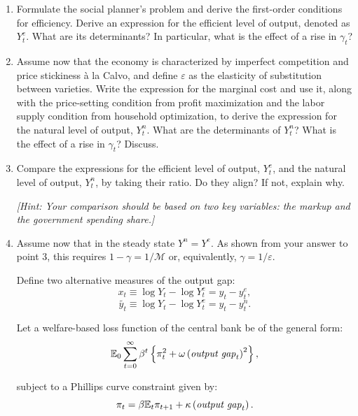 \documentclass[a4paper,11pt]{article}
\begin{document}
\begin{enumerate}
\item[1.]  Formulate the social planner’s problem and derive the first-order conditions for efficiency. Derive an expression for the efficient level of output, denoted as $Y_{t}^{e}$. What are its determinants? In particular, what is the effect of a rise in $\gamma_{t}$? 

\item [2.] Assume now that the economy is characterized by imperfect competition and price stickiness à la Calvo, and define $\varepsilon$ as the elasticity of substitution between varieties. Write the expression for the marginal cost and use it, along with the price-setting condition from profit maximization and the labor supply condition from household optimization, to derive the expression for the natural level of output, $Y^n_t$. What are the determinants of $Y^n_t$? What is the effect of a rise in $\gamma_{t}$? Discuss.

\item [3.] Compare the expressions for the efficient level of output, $Y^e_t$, and the natural level of output, $Y^n_t$, by taking their ratio. Do they align? If not, explain why. 

\textit{[Hint: Your comparison should be based on two key variables: the markup and the government spending share.]}

\item[4.] Assume now that in the steady state $Y^n=Y^e$. As shown from your answer to point 3, this requires $1-\gamma=1/\mathcal{M}$ or, equivalently, $\gamma=1/\varepsilon$. 

Define two alternative measures of the output gap:
\begin{equation}
x_{t}\equiv \log Y_t-\log Y^e_t=y_{t}-y_{t}^{e}  \label{xe},
\end{equation}
\begin{equation}
\tilde{y_{t}}\equiv \log Y_t-\log Y^e_t=y_{t}-y_{t}^{n}\label{yn}.
\end{equation}

Let a welfare-based loss function of the central bank be of the general form:
\begin{equation}
\mathbb{E}_{0} \sum_{t=0}^{\infty }\beta ^{t}\left \{ \pi
_{t}^{2}+\omega \left( \text{\textit{output gap}}_{t}\right) ^{2}
\right \},  \label{loss}
\end{equation}

subject to a Phillips curve constraint given by:
\begin{equation}
\pi _{t}=\beta \mathbb{E}_{t}\pi _{t+1} + \kappa  \left( \text{\textit{output
gap}}_{t} \right).  \label{nkpc2}
\end{equation}



\end{enumerate}
\end{document}
